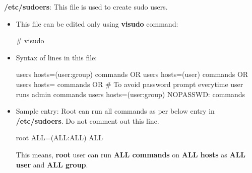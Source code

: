 \setlength{\columnsep}{3pt}
\begin{flushleft}
	\textbf{/etc/sudoers}: This file is used to create sudo users.
	\begin{itemize}
		\item This file can be edited only using \textbf{visudo} command:
		\begin{tcolorbox}[breakable,notitle,boxrule=-0pt,colback=black,colframe=black]
			\color{green}
			\font=9pt
			\# visudo
			\font=4pt
		\end{tcolorbox}
		\item Syntax of lines in this file:
		\bigskip
		\begin{tcolorbox}[breakable,notitle,boxrule=1pt,colback=pink,colframe=pink]
			\color{black}
			\font=9pt
			users hosts=(user:group) commands
			\newline
			OR
			\newline
			users hosts=(user) commands
			\newline
			OR
			\newline
			users hosts= commands
			\newline
			OR
			\newline
			\color{blue}
			\# To avoid password prompt everytime user runs admin commands
			\newline
			\color{black}
			users hosts=(user:group) NOPASSWD: commands  
			\font=4pt
			
		\end{tcolorbox}
		\item Sample entry: Root can run all commands as per below entry in \textbf{/etc/sudoers}. Do not comment out this line.
		\bigskip
		\begin{tcolorbox}[breakable,notitle,boxrule=-0pt,colback=black,colframe=black]
			\color{green}
			\font=9pt
			root ALL=(ALL:ALL) ALL
			\font=4pt
		\end{tcolorbox}
		This means, \textbf{root} user can run \textbf{ALL commands} on \textbf{ALL hosts} as \textbf{ALL user} and \textbf{ALL group}.
		
		
	\end{itemize}
	
	\newpage
	

\end{flushleft}
